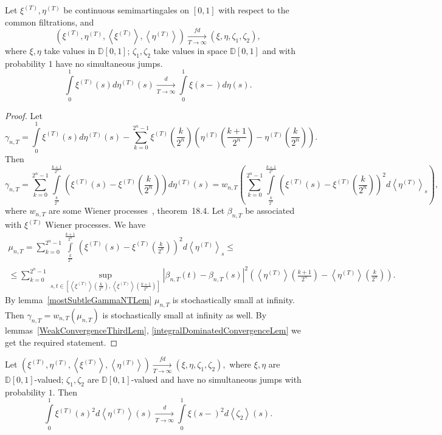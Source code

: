 \documentclass[12pt, a4paper, titlepage]{article}
\begin{document}
 \begin{theorem}\label{firstMainTheorem}
Let $\xi^{(T)}, \eta^{(T)}$ 
be continuous semimartingales on $[0,1]$ with respect to the common filtrations, and
$$\left(\xi^{(T)}, \eta^{(T)}, \left<\xi^{(T)}\right>,\left<\eta^{(T)}\right>\right)
 \xrightarrow[T\to\infty]{fd} \left(\xi, \eta, \zeta_1, \zeta_2\right),$$
where $\xi, \eta$ take values in $\mathbb{D}[0,1]$;
$\zeta_1, \zeta_2$ take values in space $\mathbb{D}[0,1]$
and with probability $1$ have no simultaneous jumps.
$$\int\limits_0^1 \xi^{(T)}(s)d\eta^{(T)}(s)
\xrightarrow[T \to \infty]{d} \int\limits_0^1 \xi(s-)d\eta(s).$$
 \end{theorem}
 \begin{proof}
  Let
$$\gamma_{n, T}=
 \int\limits_0^1 \xi^{(T)}(s)d\eta^{(T)}(s)-
 \sum\limits_{k=0}^{2^n-1}\xi^{(T)}\left(\frac{k}{2^n}\right)\left(\eta^{(T)}
 \left(\frac{k+1}{2^n}\right)-\eta^{(T)}\left(\frac{k}{2^n}\right)\right).$$
Then
$$\gamma_{n, T}=
 \sum\limits_{k=0}^{2^n-1}
 \int\limits_{\frac{k}{2^n}}^{\frac{k+1}{2^n}}
 \left(\xi^{(T)}(s)-\xi^{(T)}\left(\frac{k}{2^n}\right)\right)d\eta^{(T)}(s)=
 w_{n,T}\left(\sum\limits_{k=0}^{2^n-1}
 \int\limits_{\frac{k}{2^n}}^{\frac{k+1}{2^n}}
 \left(\xi^{(T)}(s)-\xi^{(T)}\left(\frac{k}{2^n}\right)\right)^2d\left<\eta^{(T)}\right>_s\right),
$$
where $w_{n,T}$ are some Wiener processes~\cite{Kallenberg}, theorem~18.4.  
Let $\beta_{n,T}$ be associated with $\xi^{(T)}$ Wiener processes. We have
  \begin{multline*}\mu_{n, T}=
\sum\limits_{k=0}^{2^n-1}
 \int\limits_{\frac{k}{2^n}}^{\frac{k+1}{2^n}}
 \left(\xi^{(T)}(s)-\xi^{(T)}\left(\frac{k}{2^n}\right)\right)^2d\left<\eta^{(T)}\right>_s \le \\ \le
\sum\limits_{k=0}^{2^n-1}
 \sup\limits_{s, t \in [\left<\xi^{(T)}\right>(\frac{k}{2^n}), \left<\xi^{(T)}\right>(\frac{k+1}{2^n})]}
  \left|\beta_{n,T}(t)-\beta_{n,T}(s)\right|^2
 \left(\left<\eta^{(T)}\right>\left(\frac{k+1}{2^n}\right)-\left<\eta^{(T)}\right>\left(\frac{k}{2^n}\right)
 \right).
 \end{multline*}
 By lemma~\ref{mostSubtleGammaNTLem} $\mu_{n,T}$ is stochastically small at infinity.
 Then $\gamma_{n, T}=w_{n, T}(\mu_{n,T})$ is stochastically small at infinity as well. 
 By lemmas~\ref{WeakConvergenceThirdLem}, \ref{integralDominatedConvergenceLem} 
 we get the required statement.  
 \end{proof}
 
 \begin{theorem}\label{secondMainTheorem}
  Let
  $(\xi^{(T)}, \eta^{(T)}, \left<\xi^{(T)}\right>,\left<\eta^{(T)}\right>)
  \xrightarrow[T\to\infty]{fd} (\xi, \eta, \zeta_1, \zeta_2),$
  where $\xi, \eta$ are $\mathbb{D}[0,1]$-valued;
  $\zeta_1, \zeta_2$ are $\mathbb{D}[0,1]$-valued
  and have no simultaneous jumps with probability $1$.
  Then
$$\int\limits_0^1 \xi^{(T)}(s)^2d\left<\eta^{(T)}\right>(s)
\xrightarrow[T \to \infty]{d} \int\limits_0^1 \xi(s-)^2d\left<\zeta_2\right>(s).$$
\end{theorem}
\end{document}
